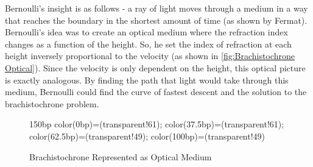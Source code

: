 Bernoulli's insight is as follows - a ray of light moves through a medium in a way that reaches the boundary in the shortest amount of time (as shown by Fermat). Bernoulli's idea was to create an optical medium where the refraction index changes as a function of the height. So, he set the index of refraction at each height inversely proportional to the velocity (as shown in \autoref{fig:Brachistochrone Optical}). Since the velocity is only dependent on the height, this optical picture is exactly analogous. By finding the path that light would take through this medium, Bernoulli could find the curve of fastest descent and the solution to the brachistochrone problem.
\begin{figure}[ht]
    \centering
    
  
 {150bp} {color(0bp)=(transparent!61);
color(37.5bp)=(transparent!61);
color(62.5bp)=(transparent!49);
color(100bp)=(transparent!49) } 


    \caption{Brachistochrone Represented as Optical Medium}
    \label{fig:Brachistochrone Optical}
\end{figure}

